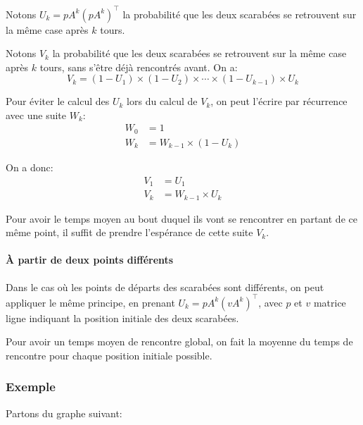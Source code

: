       Notons $U_k = pA^k(pA^k)^\intercal$ la probabilité que les deux scarabées
      se retrouvent sur la même case après $k$ tours.

      Notons $V_k$ la probabilité que les deux scarabées se retrouvent sur la
      même case après $k$ tours, sans s'être déjà rencontrés avant. On a:
        \[V_k = (1 - U_1) \times (1 - U_2) \times \cdots \times (1 - U_{k - 1})
        \times U_k\]

      Pour éviter le calcul des $U_k$ lors du calcul de $V_k$, on peut l'écrire par
      récurrence avec une suite $W_k$:
      \begin{align*}
        W_0 &= 1 \\
        W_k &= W_{k-1} \times (1 - U_k)
      \end{align*}

      On a donc:
      \begin{align*}
        V_1  &= U_1 \\
        V_k &= W_{k-1} \times U_k
      \end{align*}

      Pour avoir le temps moyen au bout duquel ils vont se rencontrer en
      partant de ce même point, il suffit de prendre l'espérance de cette suite
      $V_k$.

    \paragraph{À partir de deux points différents}
      Dans le cas où les points de départs des scarabées sont différents, on peut
      appliquer le même principe, en prenant $U_k = pA^k(vA^k)^\intercal$, avec
      $p$ et $v$ matrice ligne indiquant la position initiale des deux scarabées.

      Pour avoir un temps moyen de rencontre global, on fait la moyenne du temps
      de rencontre pour chaque position initiale possible.

  \subsubsection{Exemple}
    Partons du graphe suivant:
    \begin{center}
    \end{center}

